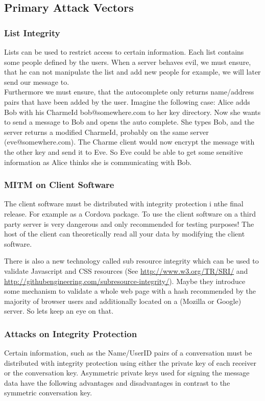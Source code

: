 \documentclass{scrartcl}
\begin{document}
  \subsection{Primary Attack Vectors}
  
  \subsubsection{List Integrity}
Lists can be used to restrict access to certain information. Each list contains some people defined by the users. When a server behaves evil, we must ensure, that he can not manipulate the list and add new people for example, we will later send our message to.\\
  
 Furthermore we must ensure, that the autocomplete only returns name/address pairs that have been added by the user. Imagine the following case: Alice adds Bob with his CharmeId bob@somewhere.com to her key directory. Now she wants to send a message to Bob and opens the auto complete. She types Bob, and the server returns a modified CharmeId, probably on the same server (eve@somewhere.com). The Charme client would now encrypt the message with the other key and send it to Eve. So Eve could be able to get some sensitive information as Alice thinks she is communicating with Bob.


  \subsubsection{MITM on Client Software}
  The client software must be distributed with integrity protection i nthe final release. For example as a Cordova package. To use the client software on a third party server is very dangerous and only recommended for testing purposes! The host of the client can theoretically read all your data by modifying the client software.
  
   There is also a new technology called sub resource integrity which can be used to validate Javascript and CSS resources (See \url{http://www.w3.org/TR/SRI/} and \url{http://githubengineering.com/subresource-integrity/}). Maybe they introduce some mechanism to validate a whole web page with a hash recommended by the majority of browser users and additionally located on a (Mozilla or Google) server. So lets keep an eye on that.

   \subsubsection{Attacks on Integrity Protection}
   Certain information, such as the Name/UserID pairs of a conversation must be distributed with integrity protection using either the private key of each receiver or the conversation key. Asymmetric private keys used for signing the message data have the following advantages and disadvantages in contrast to the symmetric conversation key.\\
   
\end{document}
